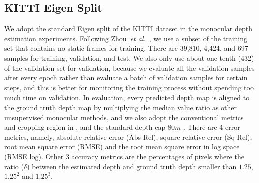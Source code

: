 \documentclass[letterpaper, 10 pt, conference]{ieeeconf}
\def\etal{\emph{et al.}}
\begin{document}
\subsection{KITTI Eigen Split}
We adopt the standard Eigen split \cite{eigen2014depth} of the KITTI dataset \cite{geiger2013vision} in the monocular depth estimation experiments. 
Following Zhou~\etal~\cite{zhou2017unsupervised}, we use a subset of the training set that contains no static frames for training. There are 39,810, 4,424, and 697 samples for training, validation, and test. 
We also only use about one-tenth (432) of the validation set for validation, because we evaluate all the validation samples after every epoch rather than evaluate a batch of validation samples for certain steps, and this is better for monitoring the training process without spending too much time on validation. 
In evaluation, every predicted depth map is aligned to the ground truth depth map by multiplying the median value ratio \cite{zhou2017unsupervised} as other unsupervised monocular methods, and we also adopt the conventional metrics and cropping region in \cite{eigen2014depth}, and the standard depth cap $80m$ \cite{godard2017unsupervised}. There are 4 error metrics, namely, absolute relative error (Abs Rel), square relative error (Sq Rel), root mean square error (RMSE) and the root mean square error in log space (RMSE log). Other 3 accuracy metrics are the percentages of pixels where the ratio ($\delta$) between the estimated depth and ground truth depth smaller than $1.25$, $1.25^2$ and $1.25^3$. 
\end{document}
